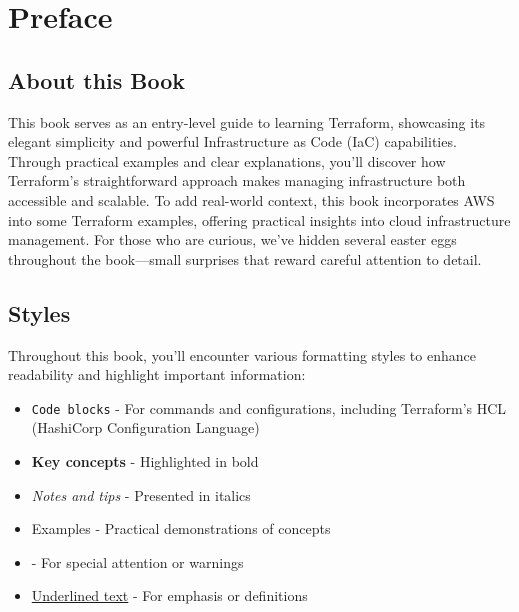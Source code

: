 \chapter*{Preface}

\section*{About this Book}

This book serves as an entry-level guide to learning Terraform, showcasing its elegant simplicity and powerful Infrastructure as Code (IaC) capabilities. Through practical examples and clear explanations, you'll discover how Terraform's straightforward approach makes managing infrastructure both accessible and scalable. To add real-world context, this book incorporates AWS into some Terraform examples, offering practical insights into cloud infrastructure management. For those who are curious, we've hidden several easter eggs throughout the book—small surprises that reward careful attention to detail.

\section*{Styles}

Throughout this book, you'll encounter various formatting styles to enhance readability and highlight important information:

\begin{itemize}[leftmargin=*,itemsep=0.1in] %
    \item \texttt{Code blocks} - For commands and configurations, including Terraform's HCL (HashiCorp Configuration Language)
    \item \textbf{Key concepts} - Highlighted in bold
    \item \textit{Notes and tips} - Presented in italics
    \item Examples - Practical demonstrations of concepts
    \item {} - For special attention or warnings
    \item \underline{Underlined text} - For emphasis or definitions
\end{itemize}

